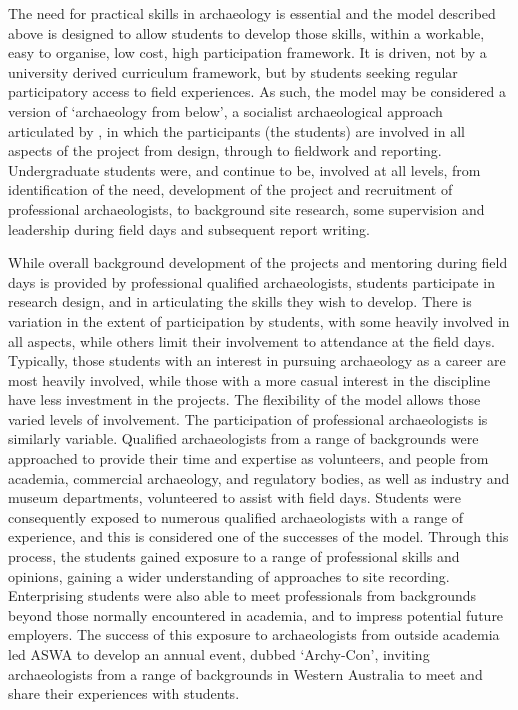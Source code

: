 \documentclass[%
]{ijsra}
\begin{document}
	
	The need for practical skills in archaeology is essential \parencites{boytner2012}{cobb2012}{colley2012}{mytum2012a}{mytum2012b}{ulm2013} and the model described above is designed to allow students to develop those skills, within a workable, easy to organise, low cost, high participation framework. 
	It is driven, not by a university derived curriculum framework, but by students seeking regular participatory access to field experiences. As such, the model may be considered a version of ‘archaeology from below’, a socialist archaeological approach articulated by \textcite{faulkner2000}, in which the participants (the students) are involved in all aspects of the project from design, through to fieldwork and reporting. 
	Undergraduate students were, and continue to be, involved at all levels, from identification of the need, development of the project and recruitment of professional archaeologists, to background site research, some supervision and leadership during field days and subsequent report writing.
	
	While overall background development of the projects and mentoring during field days is provided by professional qualified archaeologists, students participate in research design, and in articulating the skills they wish to develop. 
	There is variation in the extent of participation by students, with some heavily involved in all aspects, while others limit their involvement to attendance at the field days. 
	Typically, those students with an interest in pursuing archaeology as a career are most heavily involved, while those with a more casual interest in the discipline have less investment in the projects. The flexibility of the model allows those varied levels of involvement. The participation of professional archaeologists is similarly variable. 
	Qualified archaeologists from a range of backgrounds were approached to provide their time and expertise as volunteers, and people from academia, commercial archaeology, and regulatory bodies, as well as industry and museum departments, volunteered to assist with field days. 
	Students were consequently exposed to numerous qualified archaeologists with a range of experience, and this is considered one of the successes of the model. Through this process, the students gained exposure to a range of professional skills and opinions, gaining a wider understanding of approaches to site recording. 
	Enterprising students were also able to meet professionals from backgrounds beyond those normally encountered in academia, and to impress potential future employers. 
	The success of this exposure to archaeologists from outside academia led ASWA to develop an annual event, dubbed ‘Archy-Con’, inviting archaeologists from a range of backgrounds in Western Australia to meet and share their experiences with students.
	
\end{document}
